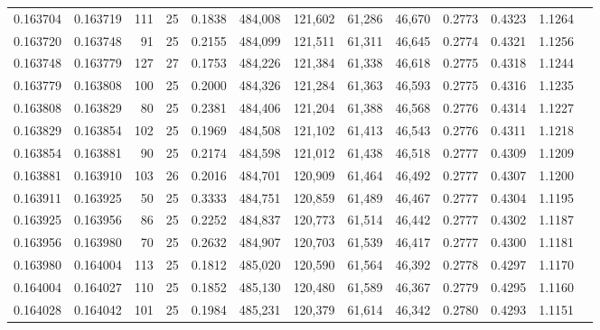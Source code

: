 \begin{tabular}{rrrrrrrrrrrrr}
0.163704 & 0.163719 & 111 &  25 &                                     0.1838 & 484,008 & 121,602 &  61,286 &  46,670 & 0.2773 & 0.4323 & 1.1264 \\
0.163720 & 0.163748 &  91 &  25 &                                     0.2155 & 484,099 & 121,511 &  61,311 &  46,645 & 0.2774 & 0.4321 & 1.1256 \\
0.163748 & 0.163779 & 127 &  27 &                                     0.1753 & 484,226 & 121,384 &  61,338 &  46,618 & 0.2775 & 0.4318 & 1.1244 \\
0.163779 & 0.163808 & 100 &  25 &                                     0.2000 & 484,326 & 121,284 &  61,363 &  46,593 & 0.2775 & 0.4316 & 1.1235 \\
0.163808 & 0.163829 &  80 &  25 &                                     0.2381 & 484,406 & 121,204 &  61,388 &  46,568 & 0.2776 & 0.4314 & 1.1227 \\
0.163829 & 0.163854 & 102 &  25 &                                     0.1969 & 484,508 & 121,102 &  61,413 &  46,543 & 0.2776 & 0.4311 & 1.1218 \\
0.163854 & 0.163881 &  90 &  25 &                                     0.2174 & 484,598 & 121,012 &  61,438 &  46,518 & 0.2777 & 0.4309 & 1.1209 \\
0.163881 & 0.163910 & 103 &  26 &                                     0.2016 & 484,701 & 120,909 &  61,464 &  46,492 & 0.2777 & 0.4307 & 1.1200 \\
0.163911 & 0.163925 &  50 &  25 &                                     0.3333 & 484,751 & 120,859 &  61,489 &  46,467 & 0.2777 & 0.4304 & 1.1195 \\
0.163925 & 0.163956 &  86 &  25 &                                     0.2252 & 484,837 & 120,773 &  61,514 &  46,442 & 0.2777 & 0.4302 & 1.1187 \\
0.163956 & 0.163980 &  70 &  25 &                                     0.2632 & 484,907 & 120,703 &  61,539 &  46,417 & 0.2777 & 0.4300 & 1.1181 \\
0.163980 & 0.164004 & 113 &  25 &                                     0.1812 & 485,020 & 120,590 &  61,564 &  46,392 & 0.2778 & 0.4297 & 1.1170 \\
0.164004 & 0.164027 & 110 &  25 &                                     0.1852 & 485,130 & 120,480 &  61,589 &  46,367 & 0.2779 & 0.4295 & 1.1160 \\
0.164028 & 0.164042 & 101 &  25 &                                     0.1984 & 485,231 & 120,379 &  61,614 &  46,342 & 0.2780 & 0.4293 & 1.1151 \\

\end{tabular}

